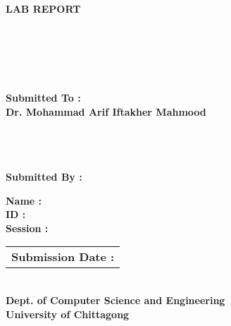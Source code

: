 \documentclass{article}
\begin{document}
\centering
\doublespacing
\begin{spacing}{1}
\textbf{\Huge{LAB REPORT}} \\ \vspace{1.5cm}
\end{spacing}

\raggedright
\begingroup
{} \\
 \\
 \\
 \\ \vspace{1.5cm}
\endgroup


\begin{sub}
\centering
\textbf{Submitted To :} \\
\textbf{\Large{Dr. Mohammad Arif Iftakher Mahmood}} \\
 \\
 \\
 \\ \vspace{1cm}
\end{sub}


\begingroup
\centering
\textbf{Submitted By :} \\
\endgroup

\begin{name}
\doublespacing
\textbf{\large{Name : }} \\ \vspace{0.5cm}
\textbf{\large{ID : }} \\ \vspace{0.5cm}
\textbf{\large{Session : }} \\ \vspace{1cm}
\end{name}

\begin{tabular}{|c|}
\hline
\textbf{\Large{Submission Date : }} \hspace{6cm} \vspace{1.2cm}
\end{tabular}



\begingroup
\centering
{} \\
\textbf{\Large{Dept. of Computer Science and Engineering}} \\
\textbf{\LARGE{University of Chittagong}} \\
\endgroup
\end{document}
